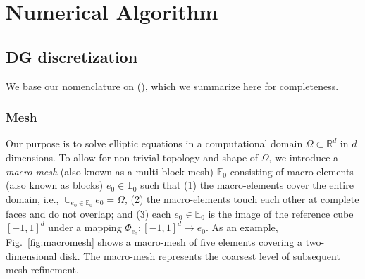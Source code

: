\section{Numerical Algorithm}
\label{sec:numericalalgorithm}

\subsection{DG discretization}
\label{sec:DGFEM}

We base our nomenclature on (\citet*{arnold.d;brezzi.f;cockburn.b;marini.l2002,sherwin20062d,di2011mathematical,fick2014interior,kozdon2018energy,kozdon2019robust}), which we summarize here for completeness.

\subsubsection{Mesh}
\label{sec:mesh}

Our purpose is to solve elliptic equations in a computational domain
$\Omega \subset \mathbb{R}^d$ in $d$ dimensions.  To allow for
non-trivial topology and shape of $\Omega$, we introduce a
\emph{macro-mesh} (also known as a multi-block mesh) $\mathbb{E}_0$ consisting of macro-elements (also known as blocks) $e_0 \in
\mathbb{E}_0$ such that (1) the macro-elements cover the entire
domain, i.e., $\cup_{e_0\in \mathbb{E}_0}e_0=\Omega$, (2) the
macro-elements touch each other at complete faces and do not overlap;
and (3) each $e_0 \in \mathbb{E}_0$ is the image of the reference cube
$[-1,1]^{d}$ under a mapping
  $\Phi_{e_0}:[-1,1]^d\rightarrow e_0$.  As an example,
Fig.~\ref{fig:macromesh} shows a macro-mesh of five elements covering a
two-dimensional disk.  The macro-mesh represents the coarsest level of
subsequent mesh-refinement.

